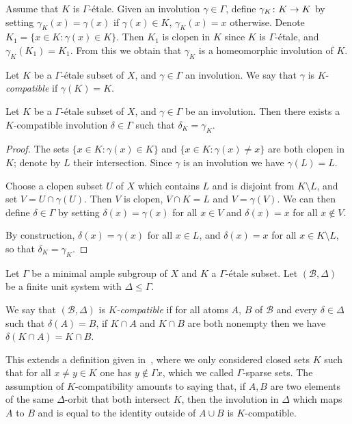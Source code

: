 \documentclass[AHL,Unicode]{cedram}
\newcommand{\mcB}{\mathcal{B}}
\renewcommand*{\to}{\mathchoice{\longrightarrow}{\rightarrow}{\rightarrow}{\rightarrow}}
\begin{document}
Assume that $K$ is $\Gamma$-étale. Given an involution $\gamma \in \Gamma$, define $\gamma_K \colon K \to K$ by setting $\gamma_K(x)= \gamma(x)$ if $\gamma(x) \in K$, $\gamma_K(x)=x$ otherwise. Denote $K_1= \{x \in K : \gamma(x) \in K\}$. Then $K_1$ is clopen in $K$ since $K$ is $\Gamma$-étale, and $\gamma_K(K_1)= K_1$. From this we obtain that $\gamma_K$ is a homeomorphic involution of $K$.

\begin{defi}
Let $K$ be a $\Gamma$-étale subset of $X$, and $\gamma \in \Gamma$ an involution. We say that $\gamma$ is $K$-\emph{compatible} if $\gamma(K)=K$.
\end{defi}

\begin{lemm}
Let $K$ be a $\Gamma$-étale subset of $X$, and $\gamma \in \Gamma$ be an involution. Then there exists a $K$-compatible involution $\delta \in \Gamma$ such that $\delta_K=\gamma_K$.
\end{lemm}

\begin{proof}
The sets $\{x \in K : \gamma(x) \in K \}$ and $\{x \in K : \gamma(x) \ne x\}$ are both clopen in $K$; denote by $L$ their intersection. Since $\gamma$ is an involution we have $\gamma(L)=L$.

Choose a clopen subset $U$ of $X$ which contains $L$ and is disjoint from $K\setminus L$, and set $V=U \cap \gamma(U)$. Then $V$ is clopen, $V \cap K=L$ and $V= \gamma (V)$. We can then define $\delta \in \Gamma$ by setting $\delta(x)=\gamma(x)$ for all $x \in V$ and $\delta(x)=x$ for all $x \not \in V$.

By construction, $\delta(x)=\gamma(x)$ for all $x \in L$, and $\delta(x)=x$ for all $x \in K \setminus L$, so that $\delta_K=\gamma_K$.
\end{proof}

\begin{defi}
Let $\Gamma$ be a minimal ample subgroup of $X$ and $K$ a $\Gamma$-étale subset. Let $(\mcB,\Delta)$ be a finite unit system with $\Delta \le \Gamma$.

We say that $(\mcB,\Delta)$ is \emph{$K$-compatible} if for all atoms $A$, $B$ of $\mcB$ and every $\delta \in \Delta$ such that $\delta(A)=B$, if $K \cap A$ and $K \cap B$ are both nonempty then we have $\delta(K \cap A)= K \cap B$.
\end{defi}

This extends a definition given in~\cite[Definition~3.10]{Melleray2023}, where we only considered closed sets $K$ such that for all $x\ne y \in K$ one has $y \not \in \Gamma x$, which we called $\Gamma$-sparse sets. The assumption of $K$-compatibility amounts to saying that, if $A,B$ are two elements of the same $\Delta$-orbit that both intersect $K$, then the involution in $\Delta$ which maps $A$ to $B$ and is equal to the identity outside of $A \cup B$ is $K$-compatible.
\end{document}
